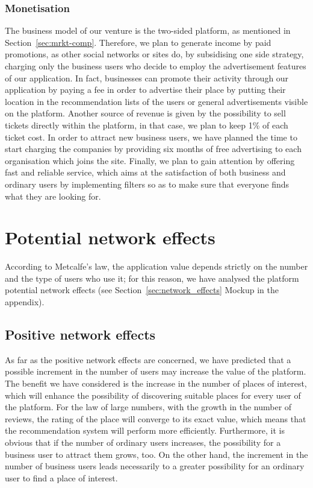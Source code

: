 \documentclass[letterpaper, 11pt]{Proposal}
\def\Sec#1{Section~\ref{#1}}
\begin{document}
\subsubsection{Monetisation}
The business model of our venture is the two-sided platform, as mentioned in \Sec{sec:mrkt-comp}. Therefore, we plan to generate income by paid promotions, as other social networks or sites do, by subsidising one side strategy, charging only the business users who decide to employ the advertisement features of our application.
In fact, businesses can promote their activity through our application by paying a fee in order to advertise their place by putting their location in the recommendation lists of the users or general advertisements visible on the platform.
Another source of revenue is given by the possibility to sell tickets directly within the platform, in that case, we plan to keep 1\% of each ticket cost. In order to attract new business users, we have planned the time to start charging the companies by providing six months of free advertising to each organisation which joins the site.
Finally, we plan to gain attention by offering fast and reliable service, which aims at the satisfaction of both business and ordinary users by implementing filters so as to make sure that everyone finds what they are looking for.

\section{Potential network effects}\label{sec:network-effects}
According to Metcalfe's law, the application value depends strictly on the number and the type of users who use it; for this reason, we have analysed the platform potential network effects (see \Sec{sec:network_effects} Mockup in the appendix).

\subsection{Positive network effects}
As far as the positive network effects are concerned, we have predicted that a possible increment in the number of users may increase the value of the platform. The benefit we have considered is the increase in the number of places of interest, which will enhance the possibility of discovering suitable places for every user of the platform. 
For the law of large numbers, with the growth in the number of reviews, the rating of the place will converge to its exact value, which means that the recommendation system will perform more efficiently. Furthermore, it is obvious that if the number of ordinary users increases, the possibility for a business user to attract them grows, too. On the other hand, the increment in the number of business users leads necessarily to a greater possibility for an ordinary user to find a place of interest.
\end{document}
